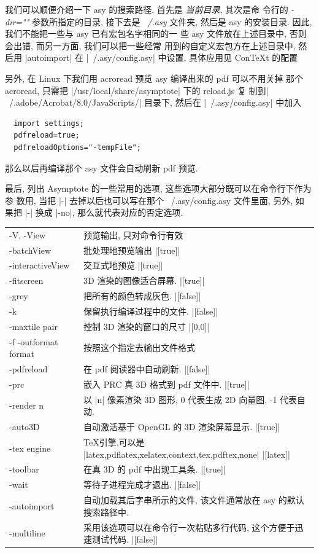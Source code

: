 \documentclass[nofonts,CJKnormalspaces]{ctexbook}[2009/05/20]
\begin{document}
我们可以顺便介绍一下 asy 的搜索路径. 首先是 \emph{当前目录}, 其次是命
令行的 \emph{-dir=""} 参数所指定的目录, 接下去是 \emph{~/.asy} 文件夹,
然后是 asy 的安装目录. 因此, 我们不能把一些与 asy 已有宏包名字相同的一
些 asy 文件放在上述目录中, 否则会出错, 而另一方面, 我们可以把一些经常
用到的自定义宏包方在上述目录中, 然后用 |autoimport| 在
|~/.asy/config.asy| 中设置, 具体应用见 ConTeXt 的配置
\pageref{ConTeXt:Settings}

另外, 在 Linux 下我们用 acroread 预览 asy 编译出来的 pdf 可以不用关掉
那个 acroread, 只需把 |/usr/local/share/asymptote| 下的 reload.js  复
制到|~/.adobe/Acrobat/8.0/JavaScripts/| 目录下, 然后在
|~/.asy/config.asy| 中加入
\begin{lstlisting}
  import settings;
  pdfreload=true;
  pdfreloadOptions="-tempFile";
\end{lstlisting}
那么以后再编译那个 asy 文件会自动刷新 pdf 预览.

最后, 列出 Asymptote 的一些常用的选项, 这些选项大部分既可以在命令行下作为参
数用, 当把 |-| 去掉以后也可以写在那个 ~/.asy/config.asy 文件里面, 另外, 如
果把 |-| 换成 |-no|, 那么就代表对应的否定选项.

\begin{longtable}[l]{l@{\hspace*{4em}}p{\dimexpr\textwidth-5em}}
  -V, -View   & 预览输出, 只对命令行有效 \\
  -batchView  & 批处理地预览输出 |[true]| \\
  -interactiveView & 交互式地预览 |[true]| \\
  -fitscreen &  3D 渲染的图像适合屏幕. |[true]| \\
  -grey & 把所有的颜色转成灰色. |[false]|\\
  -k & 保留执行编译过程中的文件. |[false]| \\
  -maxtile pair & 控制 3D 渲染的窗口的尺寸 |[0,0]|\\
  -f -outformat format & 按照这个指定去输出文件格式 \\
  -pdfreload & 在 pdf 阅读器中自动刷新. |[false]| \\
  -prc & 嵌入 PRC 真 3D 格式到 pdf 文件中. |[true]| \\
  -render n & 以 |n| 像素渲染 3D 图形, 0 代表生成 2D 向量图, -1 代表自
  动. \\
  -auto3D & 自动激活基于 OpenGL 的 3D 渲染屏幕显示. |[true]|\\
  -tex engine & \TeX 引擎,可以是 |latex,pdflatex,xelatex,context,tex,pdftex,none|
  |[latex]|\\
  -toolbar & 在真 3D 的 pdf 中出现工具条. |[true]|\\
  -wait & 等待子进程完成才退出. |[false]| \\
  -autoimport & 自动加载其后字串所示的文件, 该文件通常放在 asy 的默认搜索路径中.\\
  -multiline & 采用该选项可以在命令行一次粘贴多行代码, 这个方便于迅速测试代码. |[false]|\\

\end{longtable}
\end{document}
